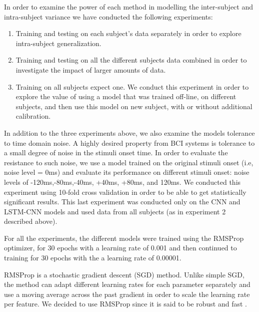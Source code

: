 \documentclass[
12pt, %
english, %
doublespacing, %
headsepline, %
]{MastersDoctoralThesis} %
\begin{document}
							
								
In order to examine the power of each method in modelling the inter-subject and  intra-subject variance we have conducted the following experiments:
\begin{enumerate}
	\item Training and testing on each subject's data separately in order to explore intra-subject generalization.
	\item Training and testing on all the different subjects data combined in order to investigate the impact of larger amounts of data.
	\item Training on all subjects expect one. We conduct this experiment in order to explore the value of using a model that was trained off-line, on different subjects, and then use this model on new subject, with or without additional calibration.
\end{enumerate}
									
In addition to the three experiments above, we also examine the models tolerance to time domain noise. A highly desired property from BCI systems is tolerance to a small degree of noise in the stimuli onset time.  In order to evaluate the resistance to such noise, we use a model trained on the original stimuli onset (i.e, noise level = 0ms) and evaluate its performance on different stimuli onset: noise levels of -120ms,-80ms,-40ms, +40ms, +80ms, and 120ms. We conducted this experiment using 10-fold cross validation in order to be able to get statistically significant results. This last experiment was conducted only on the CNN and LSTM-CNN models and used data from all subjects (as in experiment 2 described above).

For all the experiments, the different models were trained using the RMSProp~\cite{tieleman2012lecture} optimizer, for 30 epochs with a learning rate of 0.001 and then continued to training for 30 epochs with the a learning rate of 0.00001.


RMSProp \cite{tieleman2012lecture} is a stochastic gradient descent (SGD) method. Unlike simple SGD, the method can adapt different learning rates for each parameter separately and use a moving average across the past gradient in order to scale the learning rate per feature. We decided to use RMSProp since it is said to be robust and fast \cite{xu2015show, karpathy2015deep, szegedy2016rethinking}.
\end{document}
